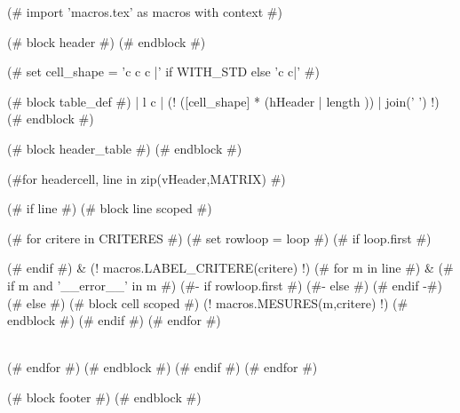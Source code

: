 (# import 'macros.tex' as macros with context #)

(# block header #)
(# endblock #)


\setlength\tabcolsep{0.07cm}

(# set cell_shape = 'c c c |' if WITH_STD else 'c c|' #)
\begin{table}[h!]
    \centering
    \begin{tabular}
        (# block table_def #){ | l c | (! ([cell_shape] *  (hHeader | length )) | join(' ') !) }
    (# endblock #)



    (# block header_table #)
    (# endblock #)



    (#for headercell, line in zip(vHeader,MATRIX) #)

    (# if line #)
    \hline
    (# block line scoped #)

    (# for critere in CRITERES #)
    (# set rowloop = loop #)
    (# if loop.first #)


    (# endif #)
    & (! macros.LABEL_CRITERE(critere) !)
    (# for m in line #)
    &
    (# if m and '__error__' in m #)
        (#- if rowloop.first #)
        (#- else #)
        (# endif -#)
    (# else #)
    (# block cell scoped #)
    (! macros.MESURES(m,critere) !)
    (# endblock #)
    (# endif #)
    (# endfor #)

        \\

    (# endfor #)
    (# endblock #)
    (# endif #)
    (# endfor #)
    \hline

    \end{tabular}

    \caption{\textbf{(! title !)}. (! description !)}
    \label{tab:(! label !)}

\end{table}

(# block footer #)
(# endblock #)
